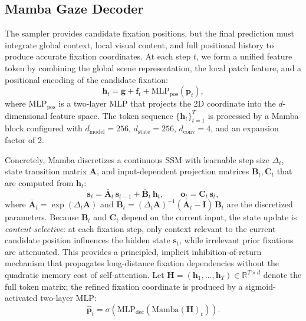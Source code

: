 \documentclass[sigconf]{acmart}
\begin{document}
\subsection{Mamba Gaze Decoder}
The sampler provides candidate fixation positions, but the final prediction must integrate global context, local visual content, and full positional history to produce accurate fixation coordinates. At each step $t$, we form a unified feature token by combining the global scene representation, the local patch feature, and a positional encoding of the candidate fixation:
\begin{equation}
  \mathbf{h}_t = \mathbf{g} + \mathbf{f}_t + \mathrm{MLP}_{\mathrm{pos}}(\mathbf{p}_t),
\end{equation}
where $\mathrm{MLP}_{\mathrm{pos}}$ is a two-layer MLP that projects the 2D coordinate into the $d$-dimensional feature space. The token sequence $\{\mathbf{h}_t\}_{t=1}^{T}$ is processed by a Mamba block configured with $d_{\mathrm{model}}=256$, $d_{\mathrm{state}}=256$, $d_{\mathrm{conv}}=4$, and an expansion factor of 2.

Concretely, Mamba discretizes a continuous SSM with learnable step size $\Delta_t$, state transition matrix $\mathbf{A}$, and input-dependent projection matrices $\mathbf{B}_t, \mathbf{C}_t$ that are computed from $\mathbf{h}_t$:
\begin{equation}
  \mathbf{s}_t = \bar{\mathbf{A}}_t\,\mathbf{s}_{t-1} + \bar{\mathbf{B}}_t\,\mathbf{h}_t, \qquad
  \mathbf{o}_t = \mathbf{C}_t\,\mathbf{s}_t,
\end{equation}
where $\bar{\mathbf{A}}_t = \exp(\Delta_t \mathbf{A})$ and $\bar{\mathbf{B}}_t = (\Delta_t \mathbf{A})^{-1}(\bar{\mathbf{A}}_t - \mathbf{I})\,\mathbf{B}_t$ are the discretized parameters. Because $\mathbf{B}_t$ and $\mathbf{C}_t$ depend on the current input, the state update is \emph{content-selective}: at each fixation step, only context relevant to the current candidate position influences the hidden state $\mathbf{s}_t$, while irrelevant prior fixations are attenuated. This provides a principled, implicit inhibition-of-return mechanism that propagates long-distance fixation dependencies without the quadratic memory cost of self-attention. Let $\mathbf{H} = (\mathbf{h}_1, \ldots, \mathbf{h}_T) \in \mathbb{R}^{T \times d}$ denote the full token matrix; the refined fixation coordinate is produced by a sigmoid-activated two-layer MLP:
\begin{equation}
  \hat{\mathbf{p}}_t = \sigma(\mathrm{MLP}_{\mathrm{dec}}(\mathrm{Mamba}(\mathbf{H})_t)).
\end{equation}
\end{document}
